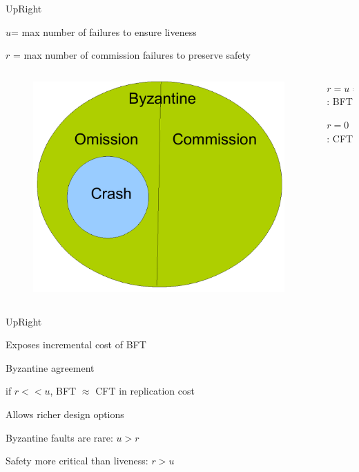 \begin{frame}{UpRight}
\BIL
\item $u$= max number of failures to ensure liveness
\item $r$ = max number of \alert{commission} failures to preserve safety
\EIL

\begin{columns}
\begin{column}{0.5\textwidth}
\begin{figure}
	\includegraphics[width=\textwidth]{figs/17/commission}
\end{figure}
\end{column}
\begin{column}{0.5\textwidth}
\BIL
\item $r=u=f$: BFT 
\item $r=0$ : CFT	
\EIL 
	
\end{column}
\end{columns}
	
\end{frame}

\begin{frame}{UpRight}
\BIL
\item Exposes incremental cost of BFT
	\BI
	\item Byzantine agreement
	\item if $r << u$, BFT $\approx$ CFT in replication cost
	\EI
\item Allows richer design options
\BI
\item Byzantine faults are rare: $u > r$ 
\item Safety more critical than liveness: $r > u$
\EI
\EIL
\end{frame}


